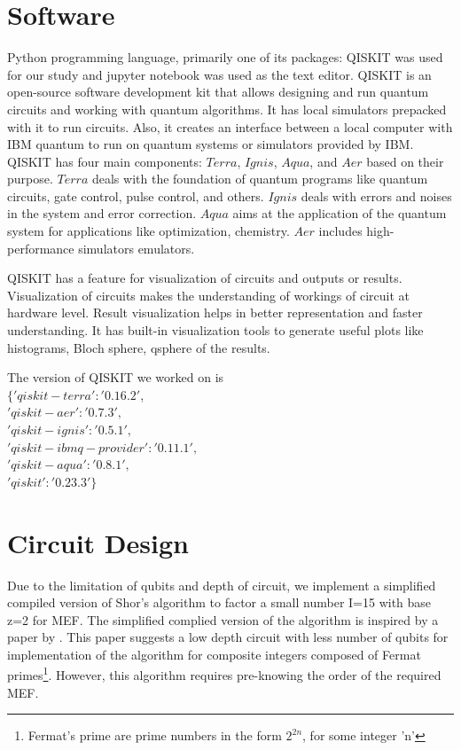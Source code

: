 \section{Software}
Python programming language, primarily one of its packages: QISKIT was used for our study and jupyter notebook was used as the text editor. QISKIT is an open-source software development kit that allows designing and run quantum circuits and working with quantum algorithms.\cite{qiskit_org} It has local simulators prepacked with it to run circuits. Also, it creates an interface between a local computer with IBM quantum to run on quantum systems or simulators provided by IBM. QISKIT has four main components: $Terra$, $Ignis$, $Aqua$, and $Aer$ based on their purpose.\cite{qiskit_org_documentation} $Terra$ deals with the foundation of quantum programs like quantum circuits, gate control, pulse control, and others. $Ignis$ deals with errors and noises in the system and error correction. $Aqua$ aims at the application of the quantum system for applications like optimization, chemistry. $Aer$ includes high-performance simulators emulators.

QISKIT has a feature for visualization of circuits and outputs or results. Visualization of circuits makes the understanding of workings of circuit at hardware level. Result visualization helps in better representation and faster understanding. It has built-in visualization tools to generate useful plots like histograms, Bloch sphere, qsphere of the results.

The version of QISKIT we worked on is
\\$\{
    'qiskit-terra': '0.16.2'$,\\
    $'qiskit-aer': '0.7.3',$\\
    $'qiskit-ignis': '0.5.1',$\\
    $'qiskit-ibmq-provider': '0.11.1',$\\
    $'qiskit-aqua': '0.8.1',$\\
    $'qiskit': '0.23.3'
 \}$

\section{Circuit Design}
Due to the limitation of qubits and depth of circuit, we implement a simplified compiled version of Shor's algorithm to factor a small number I=15 with base z=2 for \acrshort{MEF}. The simplified complied version of the algorithm is inspired by a paper by \cite{geller2013factoring}. This paper suggests a low depth circuit with less number of qubits for implementation of the algorithm for composite integers composed of Fermat primes\footnote{Fermat's prime are prime numbers in the form $2^{2n}$, for some integer 'n'}. However, this algorithm requires pre-knowing the order of the required \acrlong{MEF}. 

